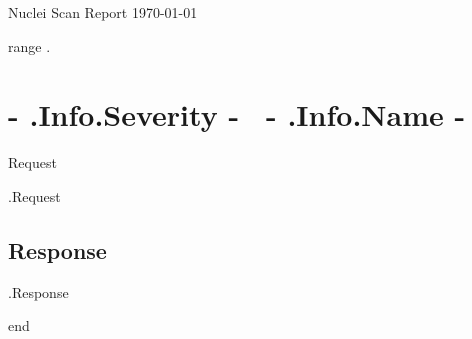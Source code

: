 \documentclass{article}
\begin{document}

\begin{titlepage}
\begin{center}
{\huge Nuclei Scan Report}
\vfill
\large{\today}

\end{center}
\end{titlepage}


{{range .}}

	\section{ \colorbox{ {{- .Info.Severity -}} }{ {{- .Info.Severity -}} }~{{- .Info.Name -}} }

	Request
	\begin{Highlighting}
    {{.Request}} 
	\end{Highlighting}

	\subsection{Response}
	\begin{Highlighting}
    {{.Response}}
	\end{Highlighting}
 
{{end}}

\end{document}
